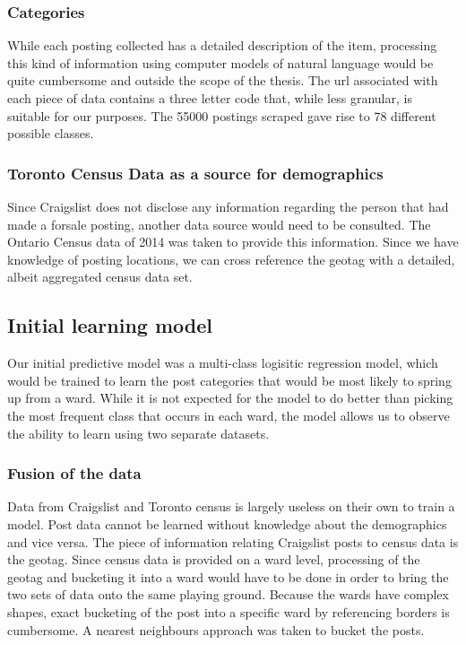 \documentclass[12pt]{article}
\begin{document}
\subsubsection{Categories}
While each posting collected has a detailed description of the item, processing this kind of information using computer models of natural language would be quite cumbersome and outside the scope of the thesis. The url associated with each piece of data contains a three letter code that, while less granular, is suitable for our purposes. The 55000 postings scraped gave rise to 78 different possible classes. 


\subsubsection{Toronto Census Data as a source for demographics}
Since Craigslist does not disclose any information regarding the person that had made a forsale posting, another data source would need to be consulted. The Ontario Census data of 2014 was taken to provide this information. Since we have knowledge of posting locations, we can cross reference the geotag with a detailed, albeit aggregated census data set. 


\subsection{Initial learning model}
Our initial predictive model was a multi-class logisitic regression model, which would be trained to learn the post categories that would be most likely to spring up from a ward. While it is not expected for the model to do better than picking the most frequent class that occurs in each ward, the model allows us to observe the ability to learn using two separate datasets.  

\subsubsection{Fusion of the data}
Data from Craigslist and Toronto census is largely useless on their own to train a model. Post data cannot be learned without knowledge about the demographics and vice versa. The piece of information relating Craigslist posts to census data is the geotag. Since census data is provided on a ward level, processing of the geotag and bucketing it into a ward would have to be done in order to bring the two sets of data onto the same playing ground. Because the wards have complex shapes, exact bucketing of the post into a specific ward by referencing borders is cumbersome. A nearest neighbours approach was taken to bucket the posts.
\end{document}
